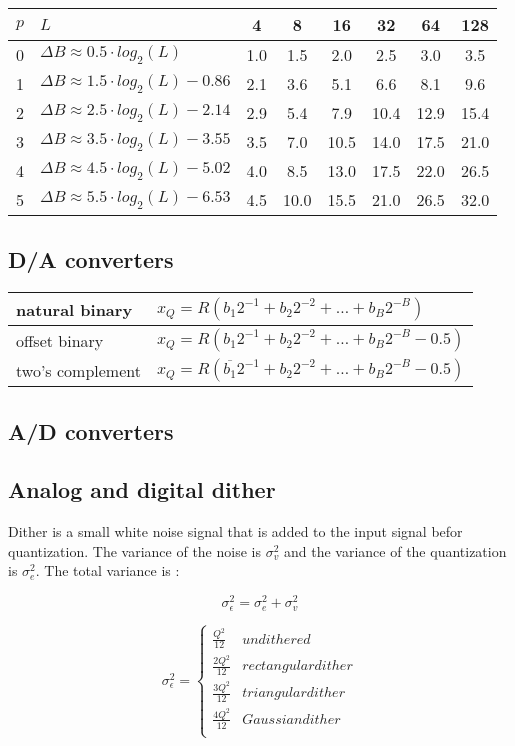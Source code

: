 \begin{tabularx}{0.75\textwidth}{|c|X|c|c|c|c|c|c|}
	\hline
	$p$	& $L$							& 4		& 8		& 16	& 32	& 64	& 128
	\\ \hline
	0	& $\Delta B \approx 0.5 \cdot log_2(L)$		& 1.0	& 1.5	& 2.0	& 2.5	& 3.0	& 3.5 \\
	1	& $\Delta B \approx 1.5 \cdot log_2(L) - 0.86$ & 2.1	& 3.6	& 5.1	& 6.6	& 8.1	& 9.6 \\
	2	& $\Delta B \approx 2.5 \cdot log_2(L) - 2.14$	& 2.9	& 5.4	& 7.9	& 10.4	& 12.9	& 15.4 \\
	3	& $\Delta B \approx 3.5 \cdot log_2(L) - 3.55$	& 3.5	& 7.0	& 10.5	& 14.0	& 17.5	& 21.0 \\
	4	& $\Delta B \approx 4.5 \cdot log_2(L) - 5.02$	& 4.0	& 8.5	& 13.0	& 17.5	& 22.0	& 26.5 \\
	5	& $\Delta B \approx 5.5 \cdot log_2(L) - 6.53$	& 4.5	& 10.0	& 15.5	& 21.0	& 26.5	& 32.0 \\
	\hline
\end{tabularx}
\resetArrayStretch


\subsection{D/A converters}
\begin{tabularx}{0.75\textwidth}{|l|X|}
	\hline
	natural binary & $x_Q = R(b_1 2^{-1} + b_2 2^{-2} + \ldots + b_B 2^{-B})$
	\\ \hline
	offset binary	& $x_Q = R(b_1 2^{-1} + b_2 2^{-2} + \ldots + b_B 2^{-B} - 0.5)$
	\\ \hline
	two's complement & $x_Q = R(\overline{b_1} 2^{-1} + b_2 2^{-2} + \ldots + b_B 2^{-B} - 0.5)$
	\\ \hline
\end{tabularx}


\subsection{A/D converters}
\subsection{Analog and digital dither}
Dither is a small white noise signal that is added to the input signal befor quantization. The variance of the noise is $\sigma_v^2$ and the variance of the quantization is $\sigma_e^2$. The total variance is :

\[ \sigma_{\epsilon}^2 = \sigma_e^2 + \sigma_v^2 \]

\begin{equation}
	\sigma_{\epsilon}^2 = 
	\begin{cases}
		\frac{Q^2}{12} & undithered \\
		\frac{2Q^2}{12} & rectangular dither \\
		\frac{3Q^2}{12} & triangular dither \\
		\frac{4Q^2}{12} & Gaussian dither \\
	\end{cases}
\end{equation}
